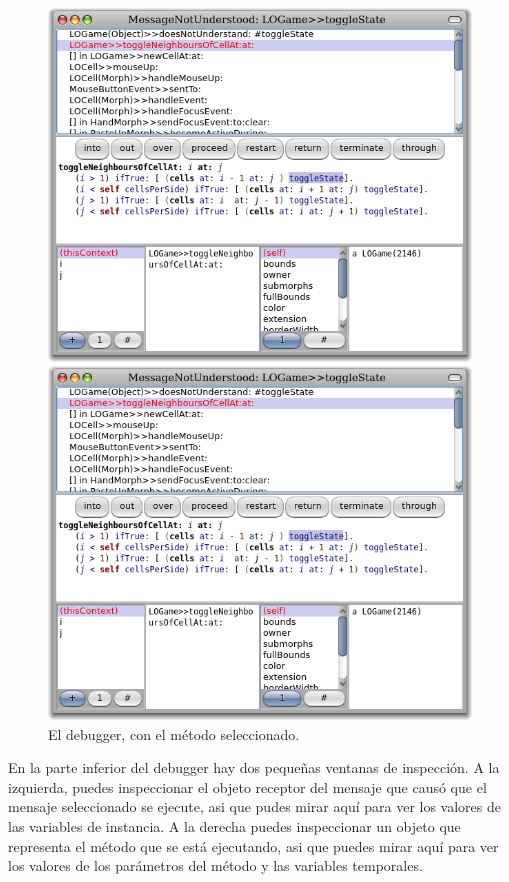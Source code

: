 \documentclass[a4paper,10pt,twoside]{book}
\begin{document}
\begin{figure}[ht]
\ifluluelse
	{\centerline {\includegraphics[width=\textwidth]{Debugger}}}
	{\centerline {\includegraphics[scale=0.7]{Debugger}}}
\caption{El debugger, con el m\'etodo   seleccionado.
}
\end{figure}

En la parte inferior del debugger hay dos pequeñas ventanas de inspecci\'on. A la izquierda, puedes inspeccionar el objeto receptor del mensaje que caus\'o que el mensaje seleccionado se ejecute, asi que pudes mirar aqu\'i para ver los valores de las variables de instancia.
A la derecha puedes inspeccionar un objeto que representa el m\'etodo que se est\'a ejecutando, asi que puedes mirar aqu\'i para ver los valores de los par\'ametros del m\'etodo y las variables temporales.
\end{document}
